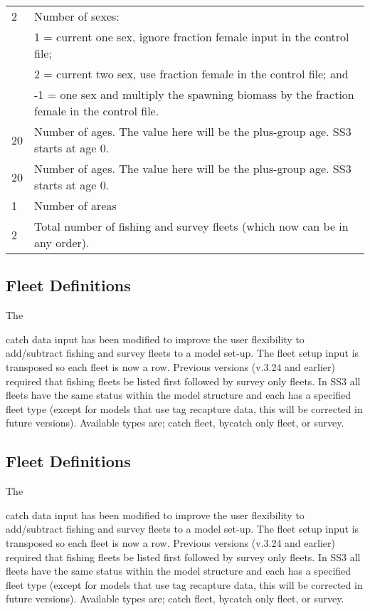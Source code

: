 \begin{center}
\begin{longtable}{p{4cm} p{12cm}}
		\hline
		2 \Tstrut & Number of sexes: \\
		 & 1 = current one sex, ignore fraction female input in the control file;\\
		 & 2 = current two sex, use fraction female in the control file; and \\
		 & -1 = one sex and multiply the spawning biomass by the fraction female in the control file. \Bstrut\\

		\hline
		20 \Tstrut & Number of ages. The value here will be the plus-group age. SS3 starts at age 0. \\
		20 \Tstrut & Number of ages. The value here will be the plus-group age. SS3 starts at age 0. \\

		\hline
		1 & Number of areas \Tstrut\Bstrut\\

		\hline
		2 \Tstrut & Total number of fishing and survey fleets (which now can be in any order).\\
		\hline
	\end{longtable}
	\vspace*{-1.7\baselineskip}
	\vspace*{-1.7\baselineskip}
\end{center}


\subsection{Fleet Definitions}
\hypertarget{GenericFleets}{The} catch data input has been modified to improve the user flexibility to add/subtract fishing and survey fleets to a model set-up. The fleet setup input is transposed so each fleet is now a row. Previous versions (v.3.24 and earlier) required that fishing fleets be listed first followed by survey only fleets. In SS3 all fleets have the same status within the model structure and each has a specified fleet type (except for models that use tag recapture data, this will be corrected in future versions). Available types are; catch fleet, bycatch only fleet, or survey.  
\subsection{Fleet Definitions}
\hypertarget{GenericFleets}{The} catch data input has been modified to improve the user flexibility to add/subtract fishing and survey fleets to a model set-up. The fleet setup input is transposed so each fleet is now a row. Previous versions (v.3.24 and earlier) required that fishing fleets be listed first followed by survey only fleets. In SS3 all fleets have the same status within the model structure and each has a specified fleet type (except for models that use tag recapture data, this will be corrected in future versions). Available types are; catch fleet, bycatch only fleet, or survey.  

